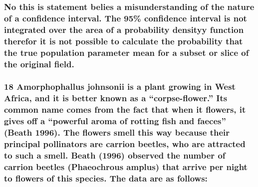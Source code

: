 \documentclass[]{article}
\begin{document}
\subsubsection{No this is statement belies a misunderstanding of the
nature of a confidence interval. The 95\% confidence interval is not
integrated over the area of a probability densityy function therefor it
is not possible to calculate the probability that the true population
parameter mean for a subset or slice of the original
field.}\label{no-this-is-statement-belies-a-misunderstanding-of-the-nature-of-a-confidence-interval.-the-95-confidence-interval-is-not-integrated-over-the-area-of-a-probability-densityy-function-therefor-it-is-not-possible-to-calculate-the-probability-that-the-true-population-parameter-mean-for-a-subset-or-slice-of-the-original-field.}

\subsubsection{\texorpdfstring{18 Amorphophallus johnsonii is a plant
growing in West Africa, and it is better known as a ``corpse-flower.''
Its common name comes from the fact that when it flowers, it gives off a
``powerful aroma of rotting fish and faeces'' (Beath 1996). The flowers
smell this way because their principal pollinators are carrion beetles,
who are attracted to such a smell. Beath (1996) observed the number of
carrion beetles (Phaeochrous amplus) that arrive per night to flowers of
this species. The data are as
follows:}{18 Amorphophallus johnsonii is a plant growing in West Africa, and it is better known as a corpse-flower. Its common name comes from the fact that when it flowers, it gives off a powerful aroma of rotting fish and faeces (Beath 1996). The flowers smell this way because their principal pollinators are carrion beetles, who are attracted to such a smell. Beath (1996) observed the number of carrion beetles (Phaeochrous amplus) that arrive per night to flowers of this species. The data are as follows:}}\label{amorphophallus-johnsonii-is-a-plant-growing-in-west-africa-and-it-is-better-known-as-a-corpse-flower.-its-common-name-comes-from-the-fact-that-when-it-flowers-it-gives-off-a-powerful-aroma-of-rotting-fish-and-faeces-beath-1996.-the-flowers-smell-this-way-because-their-principal-pollinators-are-carrion-beetles-who-are-attracted-to-such-a-smell.-beath-1996-observed-the-number-of-carrion-beetles-phaeochrous-amplus-that-arrive-per-night-to-flowers-of-this-species.-the-data-are-as-follows}
\end{document}
